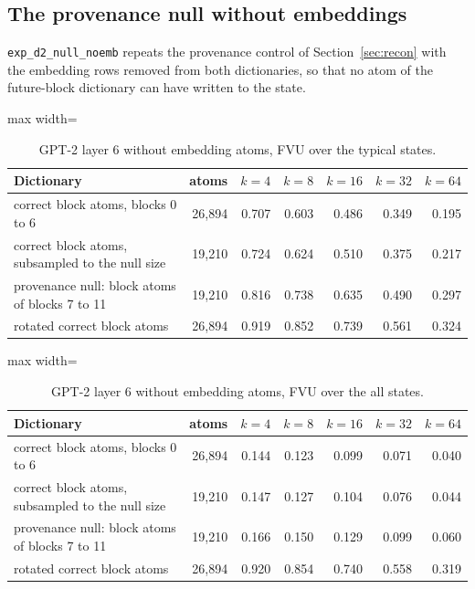 \subsection{The provenance null without embeddings}\label{app:d2}
\texttt{exp\_d2\_null\_noemb} repeats the provenance control of Section~\ref{sec:recon} with the embedding rows removed from both dictionaries, so that no atom of the future-block dictionary can have written to the state.
\begin{table}[H]\centering\scriptsize
\caption{GPT-2 layer 6 without embedding atoms, FVU over the typical states.}\label{app:d2-fvu_typical}
\begin{adjustbox}{max width=\linewidth}
\begin{tabular}{lrrrrrr}\toprule
Dictionary & atoms & $k=4$ & $k=8$ & $k=16$ & $k=32$ & $k=64$ \\ \midrule
correct block atoms, blocks 0 to 6 & 26,894 & 0.707 & 0.603 & 0.486 & 0.349 & 0.195 \\
correct block atoms, subsampled to the null size & 19,210 & 0.724 & 0.624 & 0.510 & 0.375 & 0.217 \\
provenance null: block atoms of blocks 7 to 11 & 19,210 & 0.816 & 0.738 & 0.635 & 0.490 & 0.297 \\
rotated correct block atoms & 26,894 & 0.919 & 0.852 & 0.739 & 0.561 & 0.324 \\
\bottomrule\end{tabular}\end{adjustbox}
\end{table}
\begin{table}[H]\centering\scriptsize
\caption{GPT-2 layer 6 without embedding atoms, FVU over the all states.}\label{app:d2-fvu_all}
\begin{adjustbox}{max width=\linewidth}
\begin{tabular}{lrrrrrr}\toprule
Dictionary & atoms & $k=4$ & $k=8$ & $k=16$ & $k=32$ & $k=64$ \\ \midrule
correct block atoms, blocks 0 to 6 & 26,894 & 0.144 & 0.123 & 0.099 & 0.071 & 0.040 \\
correct block atoms, subsampled to the null size & 19,210 & 0.147 & 0.127 & 0.104 & 0.076 & 0.044 \\
provenance null: block atoms of blocks 7 to 11 & 19,210 & 0.166 & 0.150 & 0.129 & 0.099 & 0.060 \\
rotated correct block atoms & 26,894 & 0.920 & 0.854 & 0.740 & 0.558 & 0.319 \\
\bottomrule\end{tabular}\end{adjustbox}
\end{table}
